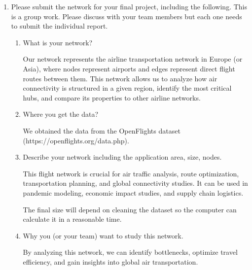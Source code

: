 \documentclass{amsart}
\theoremstyle{definition}
\theoremstyle{remark}
\numberwithin{equation}{section}
\begin{document}
\begin{enumerate}
\begin{enumerate}
\vspace{0.2cm}

\end{enumerate}

\clearpage
\item Please submit the network for your final project, including the following. This is a group work. Please discuss with your team members but each one needs to submit the individual report. 
\begin{enumerate}
\item What is your network? \vspace{0.5cm}

Our network represents the airline transportation network in Europe (or Asia), where nodes represent airports and edges represent direct flight routes between them.
This network allows us to analyze how air connectivity is structured in a given region, identify the most critical hubs, and compare its properties to other airline networks.

\vspace{0.5cm}

\item Where you get the data? \vspace{0.5cm}

We obtained the data from the OpenFlights dataset (https://openflights.org/data.php).

\vspace{0.5cm}

\item Describe your network including the application area, size, nodes. \vspace{0.5cm}

This flight network is crucial for air traffic analysis, route optimization, transportation planning, and global connectivity studies.
It can be used in pandemic modeling, economic impact studies, and supply chain logistics.

The final size will depend on cleaning the dataset so the computer can calculate it in a reasonable time. 

\vspace{0.5cm}

\item Why you (or your team) want to study this network. \vspace{0.5cm}

By analyzing this network, we can identify bottlenecks, optimize travel efficiency, and gain insights into global air transportation.

\vspace{0.5cm}

\end{enumerate}

\end{enumerate}
\end{document}
